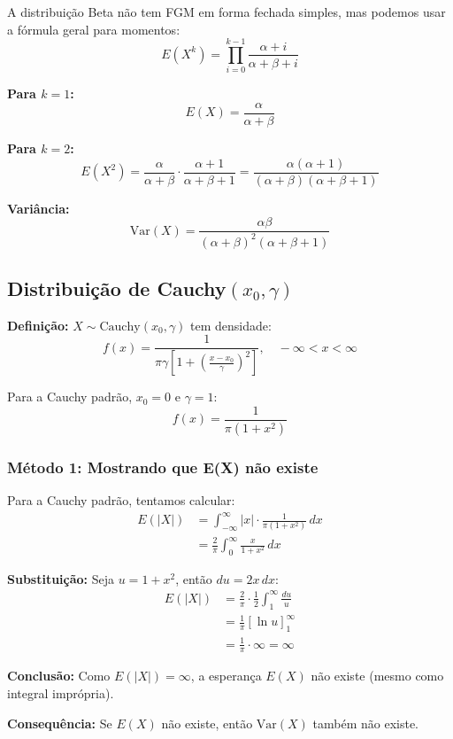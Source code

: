 \documentclass[12pt,a4paper]{article}
\theoremstyle{plain}
\theoremstyle{definition}
\theoremstyle{remark}
\begin{document}
A distribuição Beta não tem FGM em forma fechada simples, mas podemos usar a fórmula geral para momentos:
\[
E(X^k) = \prod_{i=0}^{k-1} \frac{\alpha+i}{\alpha+\beta+i}
\]

\textbf{Para \(k=1\):}
\[
E(X) = \frac{\alpha}{\alpha+\beta}
\]

\textbf{Para \(k=2\):}
\[
E(X^2) = \frac{\alpha}{\alpha+\beta} \cdot \frac{\alpha+1}{\alpha+\beta+1} = \frac{\alpha(\alpha+1)}{(\alpha+\beta)(\alpha+\beta+1)}
\]

\textbf{Variância:}
\[
\text{Var}(X) = \frac{\alpha\beta}{(\alpha+\beta)^2(\alpha+\beta+1)}
\]

\subsection{Distribuição de Cauchy\((x_0, \gamma)\)}

\textbf{Definição:} \(X \sim \text{Cauchy}(x_0, \gamma)\) tem densidade:
\[
f(x) = \frac{1}{\pi\gamma\left[1 + \left(\frac{x-x_0}{\gamma}\right)^2\right]}, \quad -\infty < x < \infty
\]

Para a Cauchy padrão, \(x_0 = 0\) e \(\gamma = 1\):
\[
f(x) = \frac{1}{\pi(1+x^2)}
\]

\subsubsection{Método 1: Mostrando que E(X) não existe}

Para a Cauchy padrão, tentamos calcular:
\begin{align}
E(|X|) &= \int_{-\infty}^{\infty} |x| \cdot \frac{1}{\pi(1+x^2)} \, dx \\
&= \frac{2}{\pi} \int_0^{\infty} \frac{x}{1+x^2} \, dx
\end{align}

\textbf{Substituição:} Seja \(u = 1 + x^2\), então \(du = 2x \, dx\):
\begin{align}
E(|X|) &= \frac{2}{\pi} \cdot \frac{1}{2} \int_1^{\infty} \frac{du}{u} \\
&= \frac{1}{\pi} [\ln u]_1^{\infty} \\
&= \frac{1}{\pi} \cdot \infty = \infty
\end{align}

\textbf{Conclusão:} Como \(E(|X|) = \infty\), a esperança \(E(X)\) não existe (mesmo como integral imprópria).

\textbf{Consequência:} Se \(E(X)\) não existe, então \(\text{Var}(X)\) também não existe.
\end{document}
